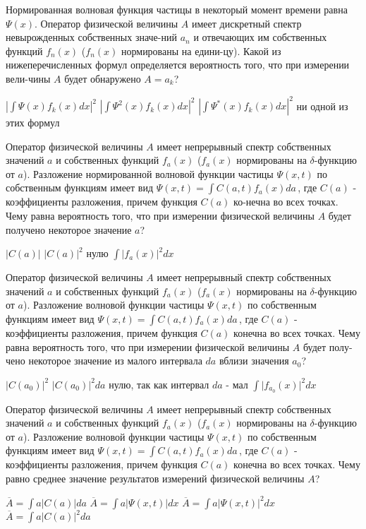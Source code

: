 \documentclass[11pt,a4paper]{exam}
\begin{document}
\begin{questions}
\question Нормированная волновая функция частицы в некоторый момент времени равна $\Psi (x)$. Оператор физической величины $A$ имеет дискретный спектр невырожденных собственных значе-ний ${a_n}$ и отвечающих им собственных функций ${f_n}(x)$ (${f_n}(x)$ нормированы на едини-цу). Какой из нижеперечисленных формул определяется вероятность того, что при измерении вели-чины $A$ будет обнаружено $A = {a_k}$?
\begin{choices}
\choice ${\left| {\int {\Psi (x){f_k}(x)dx} } \right|^2}$         
\choice ${\left| {\int {{\Psi ^2}(x){f_k}(x)dx} } \right|^2}$
\choice ${\left| {\int {{\Psi ^*}(x){f_k}(x)dx} } \right|^2}$        
\choice ни одной из этих формул
\end{choices}

\question Оператор физической величины $A$ имеет непрерывный спектр собственных значений $a$ и собственных функций ${f_a}(x)$ (${f_a}(x)$ нормированы на $\delta $-функцию от $a$). Разложение нормированной волновой функции частицы $\Psi (x,t)$ по собственным функциям имеет вид $\Psi (x,t) = \int {C(a,t){f_a}(x)da} \,$, где $C(a)$ - коэффициенты разложения, причем функция $C(a)$ ко-нечна во всех точках. Чему равна вероятность того, что при измерении физической величины $A$ будет получено некоторое значение $a$?
\begin{choices}
\choice $|C(a)|$     
\choice $|C(a){|^2}$    
\choice нулю      
\choice $\int {|{f_a}(x){|^2}dx} \,$
\end{choices}

\question Оператор физической величины $A$ имеет непрерывный спектр собственных значений $a$ и собственных функций ${f_a}(x)$ (${f_a}(x)$ нормированы на $\delta $-функцию от $a$). Разложение волновой функции частицы $\Psi (x,t)$ по собственным функциям имеет вид $\Psi (x,t) = \int {C(a,t){f_a}(x)da} \,$, где $C(a)$ - коэффициенты разложения, причем функция $C(a)$ конечна во всех точках. Чему равна вероятность того, что при измерении физической величины $A$ будет полу-чено некоторое значение из малого интервала $da$ вблизи значения ${a_0}$?
\begin{choices}
\choice $|C({a_0}){|^2}$      
\choice $|C({a_0}){|^2}da$    
\choice нулю, так как интервал $da$ - мал 
\choice $\int {|{f_{{a_0}}}(x){|^2}dx} \,$
\end{choices}

\question Оператор физической величины $A$ имеет непрерывный спектр собственных значений $a$ и собственных функций ${f_a}(x)$ (${f_a}(x)$ нормированы на $\delta $-функцию от $a$). Разложение волновой функции частицы $\Psi (x,t)$ по собственным функциям имеет вид $\Psi (x,t) = \int {C(a,t){f_a}(x)da} \,$, где $C(a)$ - коэффициенты разложения, причем функция $C(a)$ конечна во всех точках. Чему равно среднее значение результатов измерений физической величины $A$?
\begin{choices}
\choice $\overline A  = \int {a|C(a)|da} $         
\choice $\overline A  = \int {a|\Psi (x,t)|dx} $
\choice $\overline A  = \int {a|\Psi (x,t){|^2}dx} $     
\choice $\overline A  = \int {a|C(a){|^2}da} $
\end{choices}


\end{questions}
\end{document}

